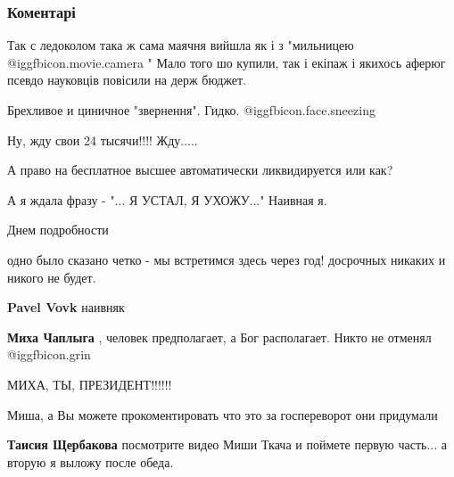  
 
 
 
 
\subsubsection{Коментарі}
\label{sec:01_12_2021.fb.chaplyga_mihail.1.vystuplenie_zelenskii_rada.cmt}

\begin{itemize} %

Так с ледоколом така ж сама маячня вийшла як і з "мильницею  @igg{fbicon.movie.camera} " Мало того шо
купили, так і екіпаж і якихось аферюг псевдо науковців повісили на держ бюджет.


Брехливое и циничное "звернення". Гидко. @igg{fbicon.face.sneezing} 

Ну, жду свои 24 тысячи!!!! Жду.....

А право на бесплатное высшее автоматически ликвидируется или как?

А я ждала фразу - "... Я УСТАЛ, Я УХОЖУ..." Наивная я.

Днем подробности

одно было сказано четко - мы встретимся здесь через год! досрочных никаких и никого не будет.

\begin{itemize} %
\textbf{Pavel Vovk} наивняк

\textbf{Миха Чаплыга} , человек предполагает, а Бог располагает. Никто не отменял @igg{fbicon.grin} 

МИХА, ТЫ, ПРЕЗИДЕНТ!!!!!!
\end{itemize} %

Миша, а Вы можете прокоментировать что это за госпереворот они придумали

\begin{itemize} %
\textbf{Таисия Щербакова} посмотрите видео Миши Ткача и поймете первую часть... а вторую я выложу после обеда.


\end{itemize}
\end{itemize}
